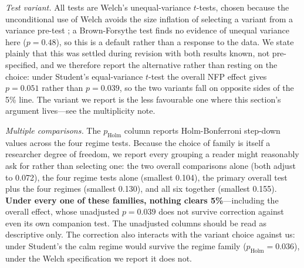 \documentclass[12pt,a4paper]{article}
\begin{document}
\begin{table}[H]
\begin{threeparttable}
\begin{tablenotes}
\item \textit{Test variant.} All tests are Welch's unequal-variance $t$-tests, chosen because the unconditional use of Welch avoids the size inflation of selecting a variant from a variance pre-test \citep{zimmerman2004, ruxton2006, delacre2017}; a Brown-Forsythe test finds no evidence of unequal variance here ($p = 0.48$), so this is a default rather than a response to the data. We state plainly that this was settled during revision with both results known, not pre-specified, and we therefore report the alternative rather than resting on the choice: under Student's equal-variance $t$-test the overall NFP effect gives $p = 0.051$ rather than $p = 0.039$, so the two variants fall on opposite sides of the 5\% line. The variant we report is the less favourable one where this section's argument lives---see the multiplicity note. %
\item \textit{Multiple comparisons.} The $p_{\text{Holm}}$ column reports Holm-Bonferroni step-down values across the four regime tests. Because the choice of family is itself a researcher degree of freedom, we report every grouping a reader might reasonably ask for rather than selecting one: the two overall comparisons alone (both adjust to 0.072), the four regime tests alone (smallest 0.104), the primary overall test plus the four regimes (smallest 0.130), and all six together (smallest 0.155). \textbf{Under every one of these families, nothing clears 5\%}---including the overall effect, whose unadjusted $p = 0.039$ does not survive correction against even its own companion test. The unadjusted columns should be read as descriptive only. The correction also interacts with the variant choice against us: under Student's the calm regime would survive the regime family ($p_{\text{Holm}} = 0.036$), under the Welch specification we report it does not. %
\end{tablenotes}
\end{threeparttable}
\end{table}
\end{document}
